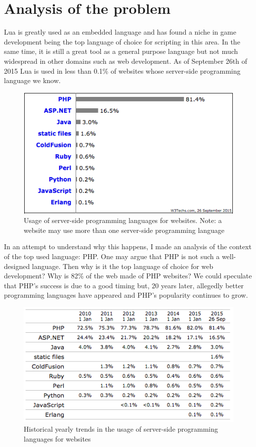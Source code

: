 \documentclass{article}
\begin{document}
	\newpage
\section{Analysis of the problem}

Lua is greatly used as an embedded language and has found a niche in game development being the top language of choice for scripting in this area\autocite{engine}. In the same time, it is still a great tool as a general purpose language but not much widespread in other domains such as web development. As of September 26th of 2015 Lua is used in less than 0.1\% of websites whose server-side programming language we know\autocite{w3server}. \\

\begin{figure}[h]
\centering\includegraphics[scale=0.7]{serverlangs.png}
\caption{\label{fig:serverlangs} Usage of server-side programming languages for websites. Note: a website may use more than one server-side programming language}
\end{figure}

In an attempt to understand why this happens, I made an analysis of the context of the top used language: PHP. One may argue that PHP is not such a well-designed language. Then why is it the top language of choice for web development? Why is 82\% of the web made of PHP websites? We could speculate that PHP's success is due to a good timing but, 20 years later, allegedly better programming languages have appeared and PHP's popularity continues to grow\autocite{phptime}.\\

\clearpage
\begin{figure}[h]
\centering\includegraphics[scale=0.7]{serverlangstime.png}
\caption{\label{fig:serverlangstime} Historical yearly trends in the usage of server-side programming languages for websites}
\end{figure}
\end{document}
